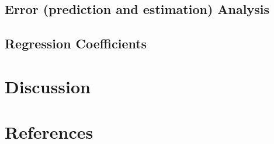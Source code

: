 \documentclass[12pt,3p,authoryear]{elsarticle}
\begin{document}
\subsection{Error (prediction and estimation)
Analysis}\label{error-prediction-and-estimation-analysis}

\subsection{Regression Coefficients}\label{regression-coefficients}

\section{Discussion}\label{discussion}

\section*{References}\label{references}

\hypertarget{refs}{}

\appendix



\renewcommand\refname{References}

\end{document}
